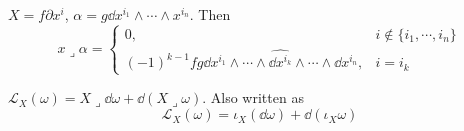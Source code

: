 \begin{example}
     $ X=f\partial x^i $,  $ \alpha=g\dd x^{i_1}\wedge\cdots\wedge x^{i_n} $. Then 
     \begin{equation}
        x\mathrel{\lrcorner}\alpha=\begin{cases}
            0,&i\not\in\{i_1,\cdots,i_n\}\\
            (-1)^{k-1}fg\dd x^{i_1}\wedge\cdots\wedge\widehat{\dd x^{i_k}}\wedge\cdots\wedge \dd x^{i_n},&i=i_k
         \end{cases}\label{eq:Easy calculation of the Cartan's binary operator}
     \end{equation}
\end{example}
\begin{theorem}\label{thm:Cartan's Magical Formula}
     $ \mathcal{L}_X(\omega)=X\mathrel{\lrcorner}\dd \omega+\dd(X\mathrel{\lrcorner}\omega) $. Also written as 
     \[\mathcal{L}_X(\omega)=\iota_X(\dd \omega)+\dd(\iota_X\omega)\] 
\end{theorem}
